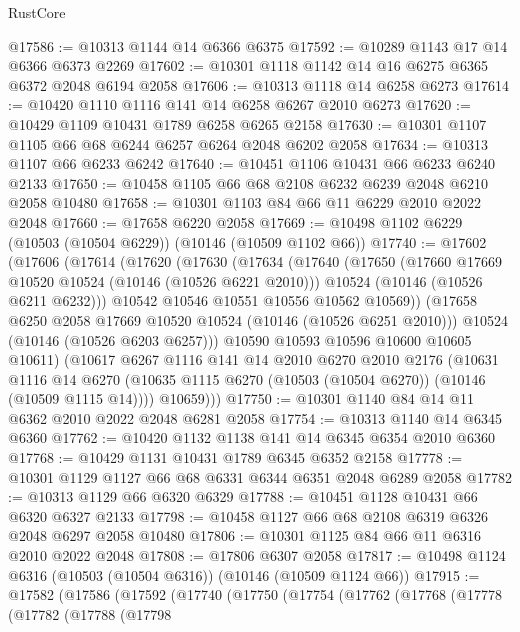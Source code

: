 \begin{lexlean}{RustCore}
\begin{coremodule}
@17586 := @10313 @1144 @14 @6366 @6375
@17592 := @10289 @1143 @17 @14 @6366 @6373 @2269
@17602 := @10301 @1118 @1142 @14 @16 @6275 @6365 @6372 @2048 @6194 @2058
@17606 := @10313 @1118 @14 @6258 @6273
@17614 := @10420 @1110 @1116 @141 @14 @6258 @6267 @2010 @6273
@17620 := @10429 @1109 @10431 @1789 @6258 @6265 @2158
@17630 := @10301 @1107 @1105 @66 @68 @6244 @6257 @6264 @2048 @6202 @2058
@17634 := @10313 @1107 @66 @6233 @6242
@17640 := @10451 @1106 @10431 @66 @6233 @6240 @2133
@17650 := @10458 @1105 @66 @68 @2108 @6232 @6239 @2048 @6210 @2058 @10480
@17658 := @10301 @1103 @84 @66 @11 @6229 @2010 @2022 @2048
@17660 := @17658 @6220 @2058
@17669 := @10498 @1102 @6229 (@10503 (@10504 @6229)) (@10146 (@10509 @1102 @66))
@17740 := @17602
    (@17606
      (@17614
        (@17620
          (@17630
            (@17634
              (@17640
                (@17650
                  (@17660 @17669 @10520 @10524 (@10146 (@10526 @6221 @2010)))
                  @10524
                  (@10146 (@10526 @6211 @6232)))
                @10542
                @10546
                @10551
                @10556
                @10562
                @10569))
            (@17658 @6250 @2058 @17669 @10520 @10524 (@10146 (@10526 @6251 @2010)))
            @10524
            (@10146 (@10526 @6203 @6257)))
          @10590
          @10593
          @10596
          @10600
          @10605
          @10611)
        (@10617
          @6267
          @1116
          @141
          @14
          @2010
          @6270
          @2010
          @2176
          (@10631
            @1116
            @14
            @6270
            (@10635 @1115 @6270 (@10503 (@10504 @6270)) (@10146 (@10509 @1115 @14))))
          @10659)))
@17750 := @10301 @1140 @84 @14 @11 @6362 @2010 @2022 @2048 @6281 @2058
@17754 := @10313 @1140 @14 @6345 @6360
@17762 := @10420 @1132 @1138 @141 @14 @6345 @6354 @2010 @6360
@17768 := @10429 @1131 @10431 @1789 @6345 @6352 @2158
@17778 := @10301 @1129 @1127 @66 @68 @6331 @6344 @6351 @2048 @6289 @2058
@17782 := @10313 @1129 @66 @6320 @6329
@17788 := @10451 @1128 @10431 @66 @6320 @6327 @2133
@17798 := @10458 @1127 @66 @68 @2108 @6319 @6326 @2048 @6297 @2058 @10480
@17806 := @10301 @1125 @84 @66 @11 @6316 @2010 @2022 @2048
@17808 := @17806 @6307 @2058
@17817 := @10498 @1124 @6316 (@10503 (@10504 @6316)) (@10146 (@10509 @1124 @66))
@17915 := @17582
    (@17586
      (@17592
        (@17740
          (@17750
            (@17754
              (@17762
                (@17768
                  (@17778
                    (@17782
                      (@17788
                        (@17798

\end{coremodule}
\end{lexlean}
